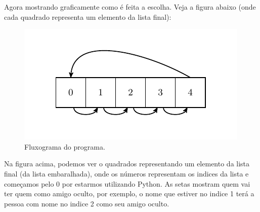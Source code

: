 Agora mostrando graficamente como é feita a escolha.
Veja a figura abaixo (onde cada quadrado representa um elemento da lista final):

\begin{figure}[H]
\centering
\includegraphics[width=.7\textwidth]{00_7_imagem_2}
\caption{Fluxograma do programa.}
\end{figure}

Na figura acima, podemos ver o quadrados representando um elemento da lista final (da lista embaralhada), onde os números representam os indices da lista e começamos pelo 0 por estarmos utilizando Python.
As setas mostram quem vai ter quem como amigo oculto, por exemplo, o nome que estiver no indice 1 terá a pessoa com nome no indice 2 como seu amigo oculto.










